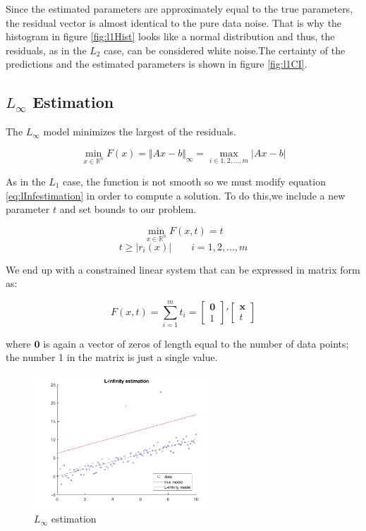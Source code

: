 Since the estimated parameters are approximately equal to the true parameters, the residual vector is almost identical to the pure data noise. That is why the histogram in figure \ref{fig:l1Hist} looks like a normal distribution and thus, the residuals, as in the $L_2$ case, can be considered white noise.The certainty of the predictions and the estimated parameters is shown in figure \ref{fig:l1CI}.

\subsection{$L_\infty$ Estimation}

The $L_\infty$ model minimizes the largest of the residuals. 

\begin{equation}
\min\limits_{x \in \mathbb{R}^n} F(x) =  \Vert A x - b \Vert_\infty =  \max\limits_{i \in {1,2,...,m}} \vert A x - b \vert
\label{eq:lInfestimation}
\end{equation}

As in the $L_1$ case, the function is not smooth so we must modify equation \ref{eq:lInfestimation} in order to compute a solution. To do this,we include a new parameter $t$ and set bounds to our problem.

\begin{equation}
\min\limits_{x \in \mathbb{R}^n} F(x,t) = t
\label{eq:lInfestimation2}
\end{equation}
\[
t \geq \vert{r_i(x)}\vert \qquad i = 1,2,...,m
\]

We end up with a constrained linear system that can be expressed in matrix form as:

\begin{equation}
F(x,t) =  \sum_{i=1}^{m} t_i = \begin{bmatrix}
\mathbf{0} \\
1
\end{bmatrix}' 
\begin{bmatrix}
\mathbf{x} \\
t
\end{bmatrix}
\label{eq:lInfestimation3}
\end{equation}

where $\mathbf{0}$ is again a vector of zeros of length equal to the number of data points; the number 1 in the matrix is just a single value.

\begin{figure}[htb]
\centering
\includegraphics[width=0.6\textwidth]{../img/LInf_norm}
\caption{$L_\infty$ estimation}
\label{fig:lInfestimation}
\end{figure}

